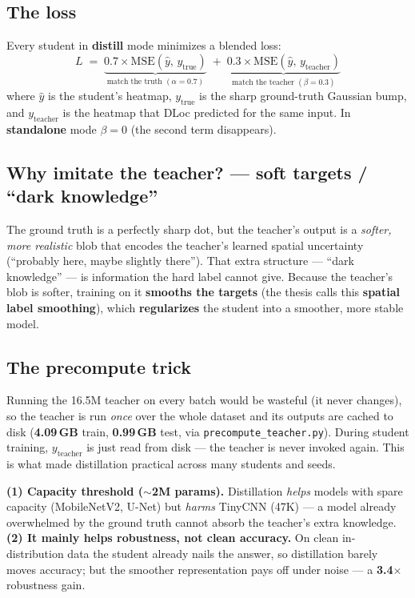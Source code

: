 \documentclass[11pt]{article}
\begin{document}
\subsection*{The loss}
Every student in \textbf{distill} mode minimizes a blended loss:
\[
  L \;=\; \underbrace{0.7 \times \mathrm{MSE}\!\left(\hat{y},\, y_{\text{true}}\right)}_{\text{match the truth }(\alpha=0.7)}
      \;+\; \underbrace{0.3 \times \mathrm{MSE}\!\left(\hat{y},\, y_{\text{teacher}}\right)}_{\text{match the teacher }(\beta=0.3)}
\]
where $\hat{y}$ is the student's heatmap, $y_{\text{true}}$ is the sharp ground-truth Gaussian bump,
and $y_{\text{teacher}}$ is the heatmap that DLoc predicted for the same input. In \textbf{standalone}
mode $\beta = 0$ (the second term disappears).

\subsection*{Why imitate the teacher? --- soft targets / ``dark knowledge''}
The ground truth is a perfectly sharp dot, but the teacher's output is a \emph{softer, more realistic}
blob that encodes the teacher's learned spatial uncertainty (``probably here, maybe slightly there'').
That extra structure --- ``dark knowledge'' --- is information the hard label cannot give. Because the
teacher's blob is softer, training on it \textbf{smooths the targets} (the thesis calls this
\textbf{spatial label smoothing}), which \textbf{regularizes} the student into a smoother, more stable
model.

\subsection*{The precompute trick}
Running the 16.5M teacher on every batch would be wasteful (it never changes), so the teacher is run
\emph{once} over the whole dataset and its outputs are cached to disk (\textbf{4.09\,GB} train,
\textbf{0.99\,GB} test, via \texttt{precompute\_teacher.py}). During student training, $y_{\text{teacher}}$
is just read from disk --- the teacher is never invoked again. This is what made distillation practical
across many students and seeds.

\begin{keybox}
\textbf{(1) Capacity threshold ($\sim$2M params).} Distillation \emph{helps} models with spare capacity
(MobileNetV2, U-Net) but \emph{harms} TinyCNN (47K) --- a model already overwhelmed by the ground truth
cannot absorb the teacher's extra knowledge.\\[1mm]
\textbf{(2) It mainly helps robustness, not clean accuracy.} On clean in-distribution data the student
already nails the answer, so distillation barely moves accuracy; but the smoother representation pays
off under noise --- a \textbf{3.4$\times$} robustness gain.
\end{keybox}
\end{document}
